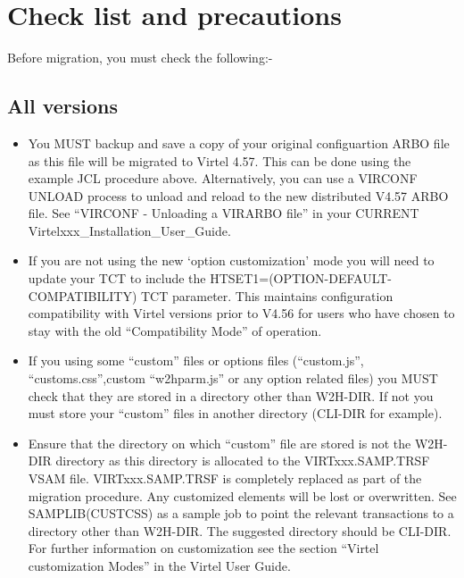 \documentclass[letterpaper,10pt,english]{sphinxmanual}
\begin{document}
\chapter{Check list and precautions}
\label{\detokenize{Migration_Guide:check-list-and-precautions}}\label{\detokenize{Migration_Guide:index-2}}
Before migration, you must check the following:-


\section{All versions}
\label{\detokenize{Migration_Guide:all-versions}}\begin{itemize}
\item {} 
You MUST backup and save a copy of your original configuartion ARBO file as this file will be migrated to Virtel 4.57. This can be done using the example JCL procedure above. Alternatively, you can use a VIRCONF UNLOAD process to unload and reload to the new distributed V4.57 ARBO file. See “VIRCONF - Unloading a VIRARBO file” in your CURRENT Virtelxxx\_Installation\_User\_Guide.

\item {} 
If you are not using the new ‘option customization’ mode you will need to update your TCT to include the HTSET1=(OPTION-DEFAULT-COMPATIBILITY) TCT parameter. This maintains configuration compatibility with Virtel versions prior to V4.56 for users who have chosen to stay with the old “Compatibility Mode” of operation.

\item {} 
If you using some “custom” files or options files (“custom.js”, “customs.css”,custom “w2hparm.js” or any option related files) you MUST check that they are stored in a directory other than W2H-DIR. If not you must store your “custom” files in another directory (CLI-DIR for example).

\item {} 
Ensure that the directory on which “custom” file are stored is not the W2H-DIR directory as this directory is allocated to the VIRTxxx.SAMP.TRSF VSAM file. VIRTxxx.SAMP.TRSF is completely replaced as part of the migration procedure. Any customized elements will be lost or overwritten. See SAMPLIB(CUSTCSS) as a sample job to point the relevant transactions to a directory other than W2H-DIR. The suggested directory should be CLI-DIR. For further information on customization see the section “Virtel customization Modes” in the Virtel User Guide.

\end{itemize}
\end{document}
